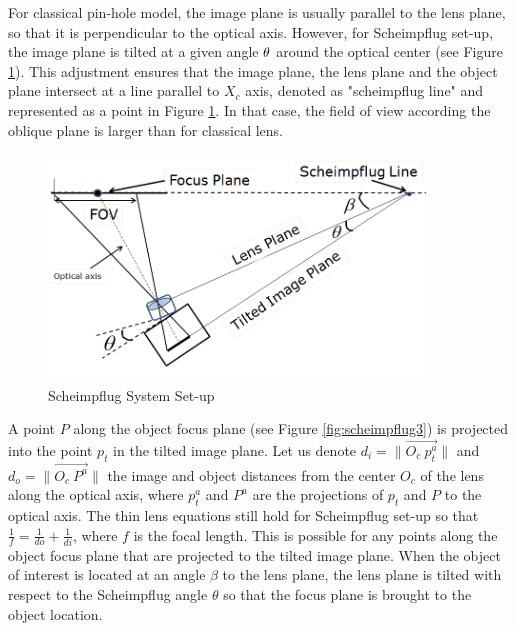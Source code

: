 \documentclass[12pt]{article}
\begin{document}



For classical pin-hole model, the image plane is usually parallel to the lens plane, so that it is perpendicular to the optical axis.  However, for Scheimpflug set-up, the image plane is tilted at a given angle ${\bf{\theta}}$ around the optical center (see  Figure \ref{fig:scheimpflug2}). This adjustment  ensures that the image plane, the lens plane and the object plane intersect at a line parallel to $X_c$ axis, denoted as  "scheimpflug line" and represented as a point in Figure \ref{fig:scheimpflug2}. In that case, the field of view according the oblique plane is larger than for classical lens.  

\begin{figure}[htb]
	\centering
	\includegraphics[height=6cm, width=10cm]{figures/scheimpflug1.png}
	\caption {Scheimpflug System Set-up}

	\label{fig:scheimpflug2}
\end{figure}







A point $P$ along the object focus plane (see Figure \ref{fig:scheimpflug3}) is projected into the point $p_t$ in the tilted image plane. Let us denote $d_{i}= \|\vec {O_c~p_t^a}\|$ and $d_{o}= \|\vec {O_c~P^a}\|$ the image and object distances from the center $O_c$ of the lens along the optical axis, where $p_t^a$ and $P^a$ are the projections of $p_t$ and $P$ to the optical axis.  The thin lens equations still hold for Scheimpflug set-up so that $\frac{1}{f}=\frac{1}{do}+\frac{1}{di}$, where $f$ is the focal length. This is possible for any points along the object focus plane that are projected to the tilted image plane.  When the object of interest is located at an angle $\beta$ to the lens plane, the lens plane is tilted with respect to the Scheimpflug angle $\theta$ so that the focus plane is brought to the object location. \\
\end{document}
